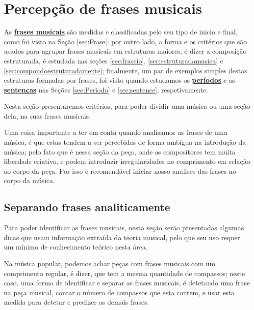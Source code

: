\newpage
\section{Percepção de frases musicais}
\label{sec:perceberfrases}

As \hyperref[sec:Frase]{\textbf{frases musicais}} são medidas e classificadas pelo seu tipo de inicio e final,
como foi visto na Seção \ref{sec:Frase};
por outro lado, a forma e os critérios que são usados para agrupar frases musicais em estruturas maiores, 
é dizer a composição estruturada, 
é estudada nas seções \ref{sec:fraseio}, \ref{sec:estruturadamusica} e \ref{sec:compondoestruturadamente};
finalmente, um par de exemplos simples destas estruturas formadas por frases,
foi visto quando estudamos os \hyperref[sec:Periodo]{\textbf{períodos}} e 
as \hyperref[sec:sentence]{\textbf{sentenças}} nas Seções \ref{sec:Periodo} e \ref{sec:sentence}, 
respetivamente.

Nesta seção presentaremos critérios, para poder dividir uma música ou uma seção dela,
na suas frases musicais. 


\begin{tcbattention}
Uma coisa importante a ter em conta quando analisamos as frases de uma música,
é que estas tendem a ser percebidas de forma ambígua na introdução da música;
pelo fato que é nessa seção da peça, onde os compositores tem muita liberdade criativa,
e podem introduzir irregularidades no comprimento em relação ao corpo da peça. 
Por isso é recomendável iniciar nosso analises das frases no corpo da música. 
\end{tcbattention}

\subsection{Separando frases analiticamente}

Para poder identificar as frases musicais, 
nesta seção serão presentadas algumas dicas que usam informação extraída da teoria musical,
pelo que seu uso requer um mínimo de conhecimento teórico nesta área. 




Na música popular, podemos achar peças com frases musicais com um comprimento regular,
é dizer, que  tem a mesma quantidade de compassos;
neste caso, uma forma de identificar e separar as frases musicais, 
é detetando uma frase na peça musical,
contar o número de compassos que esta contem, 
e usar esta medida para detetar e predizer as demais frases.


